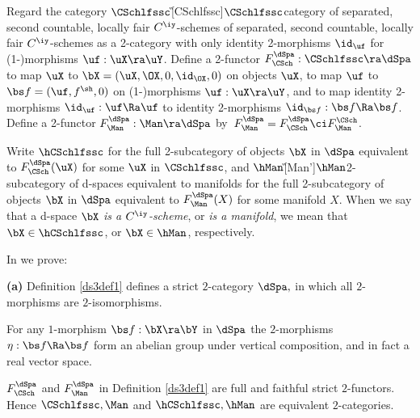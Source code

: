 \documentclass{article}
\begin{document}
\begin{dfn}
Regard the category $\CSchlfssc$\G[CSchlfssc]{$\CSchlfssc$}{category
of separated, second countable, locally fair $C^\iy$-schemes} of
separated, second countable, locally fair $C^\iy$-schemes as a
2-category with only identity 2-morphisms $\id_{\uf}$ for
(1-)mor\-phisms $\uf:\uX\ra\uY$. Define a 2-functor
$F_\CSch^\dSpa:\CSchlfssc\ra\dSpa$ to map $\uX$ to
$\bX=(\uX,\OX,0,\id_{\OX},0)$ on objects $\uX$, to map $\uf$ to $\bs
f=(\uf,f^\sh,0)$ on (1-)morphisms $\uf:\uX\ra\uY$, and to map
identity 2-morphisms $\id_\uf:\uf\Ra\uf$ to identity 2-morphisms
$\id_{\bs f}:\bs f\Ra\bs f$. Define a 2-functor
$F_\Man^\dSpa:\Man\ra\dSpa$ by~$F_{\Man}^\dSpa=F_\CSch^\dSpa\ci
F_\Man^\CSch$.

Write $\hCSchlfssc$ for the full 2-subcategory of objects $\bX$ in
$\dSpa$ equivalent to $F_\CSch^\dSpa(\uX)$ for some $\uX$ in
$\CSchlfssc$, and $\hMan$\G[Man']{$\hMan$}{2-subcategory of d-spaces
equivalent to manifolds} for the full 2-subcategory of objects $\bX$
in $\dSpa$ equivalent to $F_\Man^\dSpa(X)$ for some manifold $X$.
When we say that a d-space $\bX$ {\it is a $C^\iy$-scheme}, or {\it
is a manifold}, we mean that $\bX\in\hCSchlfssc$, or $\bX\in\hMan$,
respectively.
\label{ds3def1}
\end{dfn}

In \cite[\S 2.2]{Joyc6} we prove:

\begin{thm}{\bf(a)} Definition\/ {\rm\ref{ds3def1}} defines a
strict\/ $2$-category $\dSpa,$ in which all\/ $2$-morphisms are
$2$-isomorphisms.
\smallskip

 For any $1$-morphism $\bs f:\bX\ra\bY$ in\/
$\dSpa$ the\/ $2$-morphisms $\eta:\bs f\Ra\bs f$ form an abelian
group under vertical composition, and in fact a real vector space.
\smallskip

 $F_\CSch^\dSpa$ and\/ $F_\Man^\dSpa$ in
Definition\/ {\rm\ref{ds3def1}} are full and
faithful strict\/ $2$-functors.
Hence $\CSchlfssc,\Man$ and\/ $\hCSchlfssc,\hMan$ are equivalent\/
$2$-categories.
\label{ds3thm1}
\end{thm}
\end{document}
